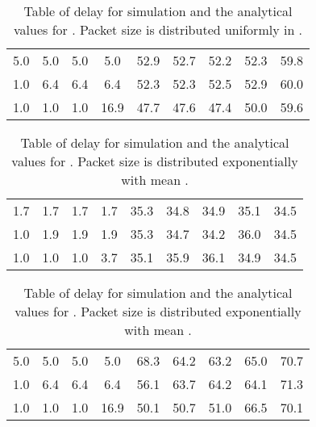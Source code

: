 \documentclass[10pt, conference, compsocconf]{IEEEtran}
\begin{document}
\begin{table}[!h]
\caption{Table of delay for simulation and the analytical values for . Packet size is distributed uniformly in .  }
\begin{center}
\begin{tabular}{|c|c|c|c|c|c|c|c|c|}
\hline  &  &  &  &  &  &  &  &   \\ 
\hline  5.0 & 5.0 & 5.0 & 5.0 & 52.9 & 52.7 & 52.2 & 52.3 & 59.8 \\ 
\hline  1.0 & 6.4 & 6.4 & 6.4 & 52.3 & 52.3 & 52.5 & 52.9 & 60.0 \\ 
\hline  1.0 & 1.0 & 1.0 & 16.9 & 47.7 & 47.6 & 47.4 & 50.0 & 59.6 \\ 
\hline 
\end{tabular} 
\end{center}
\label{table6}
\end{table}

\begin{table}[!h]
\caption{Table of delay for simulation and the analytical values for . Packet size is distributed exponentially with mean .  }
\begin{center}
\begin{tabular}{|c|c|c|c|c|c|c|c|c|}
\hline  &  &  &  &  &  &  &  &   \\ 
\hline  1.7 & 1.7 & 1.7 & 1.7 & 35.3 & 34.8 & 34.9 & 35.1 & 34.5 \\ 
\hline  1.0 & 1.9 & 1.9 & 1.9 & 35.3 & 34.7 & 34.2 & 36.0 & 34.5 \\ 
\hline  1.0 & 1.0 & 1.0 & 3.7 & 35.1 & 35.9 & 36.1 & 34.9 & 34.5 \\ 
\hline 
\end{tabular} 
\end{center}
\label{table7}
\end{table}

\begin{table}[!h]
\caption{Table of delay for simulation and the analytical values for . Packet size is distributed exponentially with mean .  }
\begin{center}
\begin{tabular}{|c|c|c|c|c|c|c|c|c|}
\hline  &  &  &  &  &  &  &  &   \\ 
\hline  5.0 & 5.0 & 5.0 & 5.0 & 68.3 & 64.2 & 63.2 & 65.0 & 70.7 \\ 
\hline  1.0 & 6.4 & 6.4 & 6.4 & 56.1 & 63.7 & 64.2 & 64.1 & 71.3 \\ 
\hline  1.0 & 1.0 & 1.0 & 16.9 & 50.1 & 50.7 & 51.0 & 66.5 & 70.1 \\ 
\hline 
\end{tabular} 
\end{center}
\label{table8}
\end{table}
\end{document}
